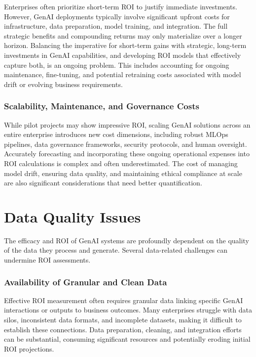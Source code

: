 \documentclass{article}
\begin{document}
Enterprises often prioritize short-term ROI to justify immediate investments. However, GenAI deployments typically involve significant upfront costs for infrastructure, data preparation, model training, and integration. The full strategic benefits and compounding returns may only materialize over a longer horizon. Balancing the imperative for short-term gains with strategic, long-term investments in GenAI capabilities, and developing ROI models that effectively capture both, is an ongoing problem. This includes accounting for ongoing maintenance, fine-tuning, and potential retraining costs associated with model drift or evolving business requirements.


\subsubsection{Scalability, Maintenance, and Governance Costs}

While pilot projects may show impressive ROI, scaling GenAI solutions across an entire enterprise introduces new cost dimensions, including robust MLOps pipelines, data governance frameworks, security protocols, and human oversight. Accurately forecasting and incorporating these ongoing operational expenses into ROI calculations is complex and often underestimated. The cost of managing model drift, ensuring data quality, and maintaining ethical compliance at scale are also significant considerations that need better quantification.


\section{Data Quality Issues}


The efficacy and ROI of GenAI systems are profoundly dependent on the quality of the data they process and generate. Several data-related challenges can undermine ROI assessments.


\subsubsection{Availability of Granular and Clean Data}

Effective ROI measurement often requires granular data linking specific GenAI interactions or outputs to business outcomes. Many enterprises struggle with data silos, inconsistent data formats, and incomplete datasets, making it difficult to establish these connections. Data preparation, cleaning, and integration efforts can be substantial, consuming significant resources and potentially eroding initial ROI projections.
\end{document}
